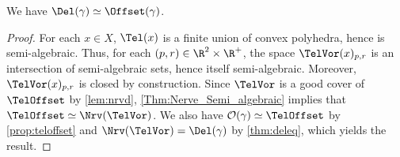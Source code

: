 \begin{proposition}\label{Prop:Del_Weak_Equiv} We have $\Del(\gamma)\simeq \Offset(\gamma)$.
\end{proposition}
\begin{proof}
For each $x\in X$, $\Tel(x)$ is a finite union of convex polyhedra, hence is semi-algebraic.   Thus, for each $(p,r)\in \R^2\times \R^+$, the space  $\TelVor(x)_{p,r}$ is an intersection of semi-algebraic sets, hence itself semi-algebraic.  Moreover, $\TelVor(x)_{p,r}$ is closed by construction.  Since $\TelVor$ is a good cover of $\TelOffset$  by \cref{lem:nrvd}, \cref{Thm:Nerve_Semi_algebraic} implies that $\TelOffset\simeq  \Nrv(\TelVor)$.  We also have $\mathcal O(\gamma) \simeq \TelOffset$ by \cref{prop:teloffset} and $\Nrv(\TelVor)= \Del(\gamma)$ by \cref{thm:deleq}, which yields the result.  
\end{proof}
%
%
%
